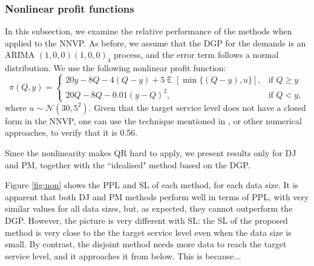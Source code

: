\documentclass{article}
\DeclareMathOperator{\E}{\mathbb{E}}
\begin{document}
\begin{table}
\caption{Target service level effect on percentage profit loss and service level with 4800 data points}
\label{tab:level_effect4800}
\centering
{}
\end{table}

\subsubsection{Nonlinear profit functions} \label{sub:exp2}

In this subsection, we examine the relative performance of the methods when applied to the NNVP. As before, we assume that the DGP for the demands is an ARIMA $(1,0,0)(1,0,0)_4$ process, and the error term follows a normal distribution. We use the following nonlinear profit function:
\[
    \pi(Q,y)=
    \begin{cases}
        20y-8Q-4(Q-y)+5\E[\min \{(Q-y),u\}],& \text{if } Q\geq y\\
        20Q-8Q-0.01(y-Q)^2,& \text{if } Q< y,
    \end{cases}
\]
where $u\sim \mathcal{N}(30,5^2)$. Given that the target service level does not have a closed form in the NNVP, one can use the technique mentioned in \cite{KK18}, or other numerical approaches, to verify that it is 0.56.

Since the nonlinearity makes QR hard to apply, we present results only for DJ and PM, together with the ``idealised" method based on the DGP.

Figure \ref{fig:non} shows the PPL and SL of each method, for each data size. It is apparent that both DJ and PM methods perform well in terms of PPL, with very similar values for all data sizes, but, as expected, they cannot outperform the DGP. However, the picture is very different with SL: the SL of the proposed method is very close to the the target service level even when the data size is small. By contrast, the disjoint method needs more data to reach the target service level, and it approaches it from below. This is because...
\end{document}
